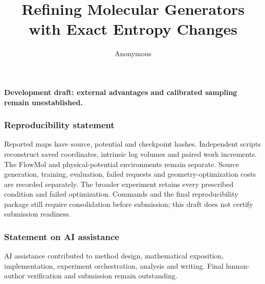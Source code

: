 \documentclass{article}
\title{Refining Molecular Generators with Exact Entropy Changes}
\author{Anonymous}
\begin{document}
\maketitle
\begin{center}
\textbf{Development draft: external advantages and calibrated sampling remain unestablished.}
\end{center}

\label{endofmaintext}

\subsubsection*{Reproducibility statement}
Reported maps have source, potential and checkpoint hashes. Independent scripts
reconstruct saved coordinates, intrinsic log volumes and paired work increments.
The FlowMol and physical-potential environments remain separate. Source generation,
training, evaluation, failed requests and geometry-optimization costs are recorded
separately. The broader experiment retains every prescribed condition and failed
optimization. Commands and the final reproducibility package still require
consolidation before submission; this draft does not certify submission readiness.

\subsubsection*{Statement on AI assistance}
AI assistance contributed to method design, mathematical exposition, implementation,
experiment orchestration, analysis and writing. Final human-author verification
and submission remain outstanding.



\appendix

\end{document}
